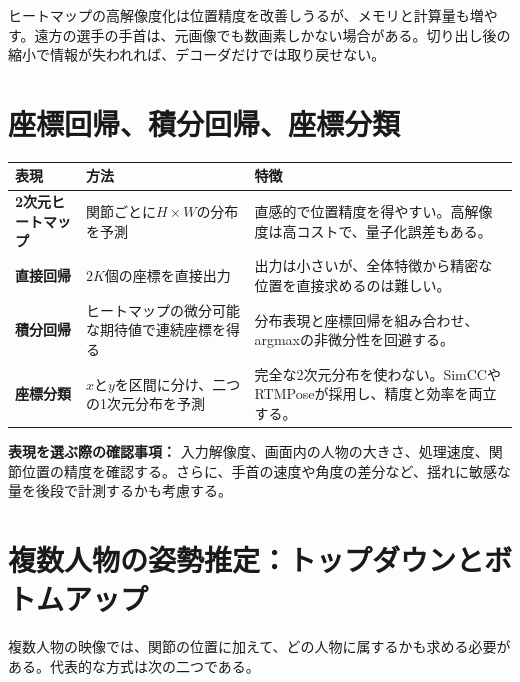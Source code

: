 \documentclass[11pt,a4paper,oneside]{report}
\begin{document}
ヒートマップの高解像度化は位置精度を改善しうるが、メモリと計算量も増やす。遠方の選手の手首は、元画像でも数画素しかない場合がある。切り出し後の縮小で情報が失われれば、デコーダだけでは取り戻せない。

\section{座標回帰、積分回帰、座標分類}

\begin{tabularx}{\textwidth}{>{\bfseries\RaggedRight}p{3.5cm} Y Y}
\toprule
表現 & 方法 & 特徴 \\
\midrule
2次元ヒートマップ & 関節ごとに$H\times W$の分布を予測 & 直感的で位置精度を得やすい。高解像度は高コストで、量子化誤差もある。\\
直接回帰 & $2K$個の座標を直接出力 & 出力は小さいが、全体特徴から精密な位置を直接求めるのは難しい。\\
積分回帰 & ヒートマップの微分可能な期待値で連続座標を得る & 分布表現と座標回帰を組み合わせ、argmaxの非微分性を回避する。\\
座標分類 & $x$と$y$を区間に分け、二つの1次元分布を予測 & 完全な2次元分布を使わない。SimCCやRTMPoseが採用し、精度と効率を両立する。\\
\bottomrule
\end{tabularx}

\begin{plainBox}
\textbf{表現を選ぶ際の確認事項：}\quad
入力解像度、画面内の人物の大きさ、処理速度、関節位置の精度を確認する。さらに、手首の速度や角度の差分など、揺れに敏感な量を後段で計測するかも考慮する。
\end{plainBox}

\clearpage
\section{複数人物の姿勢推定：トップダウンとボトムアップ}

複数人物の映像では、関節の位置に加えて、どの人物に属するかも求める必要がある。代表的な方式は次の二つである。
\end{document}
